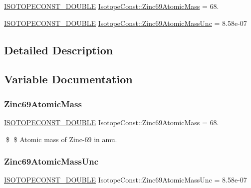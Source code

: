 \begin{DoxyCompactItemize}
\item 
\mbox{\hyperlink{group___isotope_const-_macros_ga8f45a7272ce02c0b4c65c44636ed719a}{I\+S\+O\+T\+O\+P\+E\+C\+O\+N\+S\+T\+\_\+\+D\+O\+U\+B\+LE}} \mbox{\hyperlink{group___isotope_const-_zinc-_zn69_gaeb22ece34f5ecf25ad3e092bd0608c0b}{Isotope\+Const\+::\+Zinc69\+Atomic\+Mass}} = 68.
\item 
\mbox{\hyperlink{group___isotope_const-_macros_ga8f45a7272ce02c0b4c65c44636ed719a}{I\+S\+O\+T\+O\+P\+E\+C\+O\+N\+S\+T\+\_\+\+D\+O\+U\+B\+LE}} \mbox{\hyperlink{group___isotope_const-_zinc-_zn69_ga08c31216e273f70abdf4b1c2e3de075a}{Isotope\+Const\+::\+Zinc69\+Atomic\+Mass\+Unc}} = 8.\+58e-\/07
\end{DoxyCompactItemize}


\subsection{Detailed Description}


\subsection{Variable Documentation}
\mbox{\label{group___isotope_const-_zinc-_zn69_gaeb22ece34f5ecf25ad3e092bd0608c0b}} 
\subsubsection{\texorpdfstring{Zinc69\+Atomic\+Mass}{Zinc69AtomicMass}}
{\footnotesize\ttfamily \mbox{\hyperlink{group___isotope_const-_macros_ga8f45a7272ce02c0b4c65c44636ed719a}{I\+S\+O\+T\+O\+P\+E\+C\+O\+N\+S\+T\+\_\+\+D\+O\+U\+B\+LE}} Isotope\+Const\+::\+Zinc69\+Atomic\+Mass = 68.}

\$ \$ Atomic mass of Zinc-\/69 in amu. \mbox{\label{group___isotope_const-_zinc-_zn69_ga08c31216e273f70abdf4b1c2e3de075a}} 
\subsubsection{\texorpdfstring{Zinc69\+Atomic\+Mass\+Unc}{Zinc69AtomicMassUnc}}
{\footnotesize\ttfamily \mbox{\hyperlink{group___isotope_const-_macros_ga8f45a7272ce02c0b4c65c44636ed719a}{I\+S\+O\+T\+O\+P\+E\+C\+O\+N\+S\+T\+\_\+\+D\+O\+U\+B\+LE}} Isotope\+Const\+::\+Zinc69\+Atomic\+Mass\+Unc = 8.\+58e-\/07}

